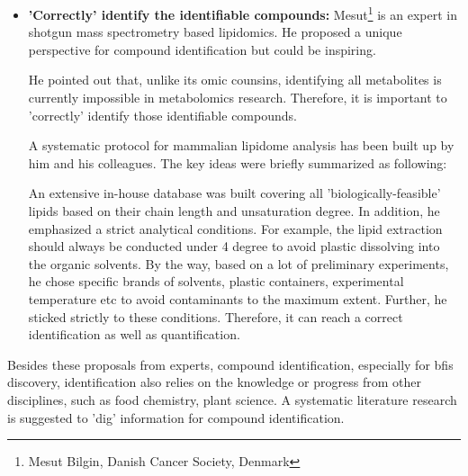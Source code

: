 \begin{itemize}
    \item \textbf{'Correctly' identify the identifiable compounds:}
    Mesut\footnote{Mesut Bilgin, Danish Cancer Society, Denmark} is an expert in shotgun mass spectrometry based lipidomics.
    He proposed a unique perspective for compound identification but could be inspiring. 
    
    He pointed out that, unlike its omic counsins, identifying all metabolites is currently impossible in metabolomics research. Therefore, it is important to 'correctly' identify those identifiable compounds. 
    
     A systematic protocol for mammalian lipidome analysis has been built up by him and his colleagues\cite{Nielsen2017}. The key ideas were briefly summarized as following: 
     
     An extensive in-house database was built covering all 'biologically-feasible' lipids based on their chain length and unsaturation degree. In addition, he emphasized a strict analytical conditions. For example, the lipid extraction should always be conducted under 4 degree to avoid plastic dissolving into the organic solvents. 
     By the way, based on a lot of preliminary experiments, he chose specific brands of solvents, plastic containers, experimental temperature etc to avoid contaminants to the maximum extent. Further, he sticked strictly to these conditions. Therefore, it can reach a correct identification as well as quantification.
\end{itemize}

Besides these proposals from experts, compound identification, especially for \acrlong{bfis} discovery, identification also relies on the knowledge or progress from other disciplines, such as food chemistry, plant science. A systematic literature research is suggested to 'dig' information for compound identification\cite{Pratico2018}.




